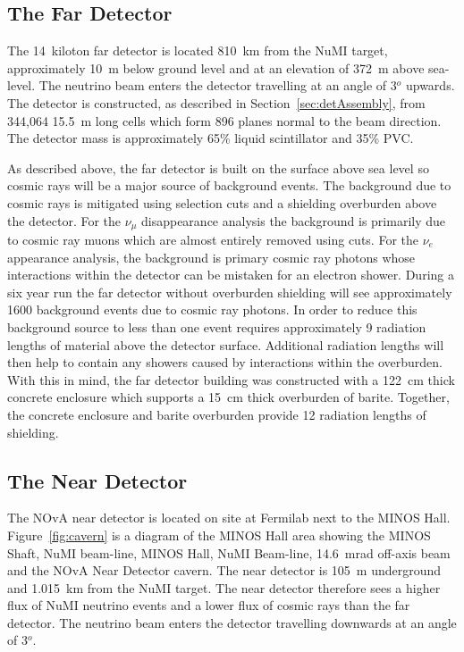 \subsection{The Far Detector}\label{sec:fardet}

The 14~kiloton far detector is located 810~km from the NuMI target,
approximately 10~m below ground level and at an elevation of 372~m
above sea-level. The neutrino beam enters the
detector travelling at an angle of 3$^o$ upwards. The detector is
constructed, as described in Section~\ref{sec:detAssembly}, from
344,064 15.5~m long cells which form 896 planes normal to the beam
direction. The detector mass is approximately 65\% liquid scintillator
and 35\% PVC.

As described above, the far detector is built on the surface above sea
level so cosmic rays will be a major source of
background events. The background due to cosmic rays is mitigated
using selection cuts and a shielding overburden above the detector.
For the $\nu_{\mu}$ disappearance analysis the background is primarily
due to cosmic ray muons which are almost entirely removed using cuts. For
the $\nu_e$
appearance analysis, the background is primary cosmic ray photons
whose interactions within the detector can be mistaken for an electron
shower. 
During a six year run the far detector without overburden shielding will see
approximately 1600 background events due to cosmic ray photons. In
order to reduce this background source to less than one event requires
approximately 9 radiation lengths of material above the detector
surface. Additional radiation lengths will then help to contain any
showers caused by interactions within the overburden. With this in
mind, the far detector building was constructed with a 122~cm thick
concrete enclosure which supports a 15~cm thick overburden of
barite. Together, the concrete enclosure and barite overburden provide
12 radiation lengths of shielding.



\subsection{The Near Detector}\label{sec:neardet}

The NOvA near detector is located on site at Fermilab next to the
MINOS Hall. Figure~\ref{fig:cavern} is a diagram of the MINOS Hall
area showing the MINOS Shaft, NuMI beam-line, MINOS Hall, NuMI
Beam-line, 14.6~mrad off-axis beam and the NOvA Near Detector cavern. 
The near detector is 105~m
underground and 1.015~km from the NuMI target. The near detector
therefore sees a higher flux of NuMI neutrino events and a lower flux
of cosmic rays than the far detector.
The neutrino beam enters the detector travelling downwards at an angle
of 3$^o$. 

